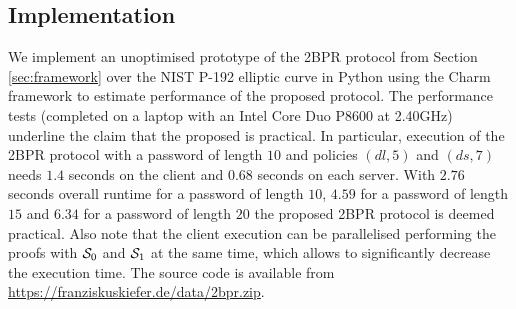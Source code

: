 \subsection{Implementation}


We implement an unoptimised prototype of the \ac{2BPR} protocol from Section \ref{sec:framework} over the NIST P-192 elliptic curve \cite{nist} in Python using the Charm framework \cite{charm13} to estimate performance of the proposed protocol.
The performance tests (completed on a laptop with an Intel Core Duo P8600 at 2.40GHz) underline the claim that the proposed is practical.
In particular, execution of the \ac{2BPR} protocol with a password of length $10$ and policies $(dl, 5)$ and $(ds, 7)$ needs $1.4$ seconds on the client and $0.68$ seconds on each server.
With $2.76$ seconds overall runtime for a password of length $10$, $4.59$ for a password of length $15$ and $6.34$ for a password of length $20$ the proposed \ac{2BPR} protocol is deemed practical.
Also note that the client execution can be parallelised performing the proofs with $\mathcal{S}_0$ and $\mathcal{S}_1$ at the same time, which allows to significantly decrease the execution time.
The source code is available from \url{https://franziskuskiefer.de/data/2bpr.zip}.


